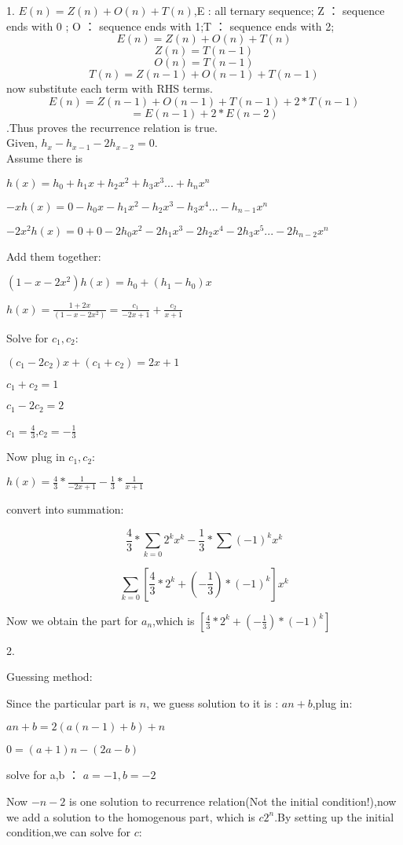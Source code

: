 \documentclass{article}
\begin{document}
1.
$E(n) = Z(n)+ O(n) + T(n)$,E : all ternary sequence; Z ： sequence ends with 0 ; O ： sequence ends with 1;T ： sequence ends with 2;
$$E(n) = Z(n)+ O(n) + T(n)$$
$$Z(n) = T(n-1)$$
$$O(n) = T(n-1)$$
$$T(n) = Z(n-1)+ O(n-1) + T(n-1) $$
now substitute each term with RHS terms.
$$E(n) = Z(n-1)+ O(n-1) + T(n-1)+ 2*T(n-1)$$
$$= E(n-1)+ 2*E(n-2)$$.Thus proves the recurrence relation is true.\\

Given, $h_x-h_{x-1}-2h_{x-2}=0$.
\\Assume there is 

$h(x) = h_0+h_1x+h_2x^2+h_3x^3...+h_nx^n$

$-xh(x) = 0-h_0x-h_1x^2-h_2x^3-h_3x^4...-h_{n-1}x^n$

$-2x^2h(x) = 0+0-2h_0x^2-2h_1x^3-2h_2x^4-2h_3x^5...-2h_{n-2}x^n$

Add them together:

$(1-x-2x^2)h(x)=h_0+(h_1-h_0)x$

$h(x)=\frac{1+2x}{(1-x-2x^2)}=\frac{c_1}{-2x+1}+\frac{c_2}{x+1}$

Solve for $c_1,c_2$:

$(c_1-2c_2)x+(c_1+c_2)=2x+1$

$c_1+c_2=1$

$c_1-2c_2=2$

$c_1=\frac{4}{3}$,$c_2=-\frac{1}{3}$

Now plug in $c_1,c_2$:

$h(x)=\frac{4}{3}*\frac{1}{-2x+1}-\frac{1}{3}*\frac{1}{x+1}$

convert into summation:

$$\frac{4}{3}*\sum_{k=0}2^kx^k-\frac{1}{3}*\sum(-1)^kx^k$$

$$\sum_{k=0}[\frac{4}{3}*2^k+(-\frac{1}{3})*(-1)^k]x^k$$

Now we obtain the part for $a_n$,which is $[\frac{4}{3}*2^k+(-\frac{1}{3})*(-1)^k]$

2.

Guessing method:

Since the particular part is $n$, we guess solution to it is :
$an+b$,plug in:

$an+b=2(a(n-1)+b)+n$

$0=(a+1)n-(2a-b)$

solve for a,b ： $a = -1,b=-2$

Now $-n-2$ is one solution to recurrence relation(Not the initial condition!),now we add a solution to the homogenous part, which is $c2^n$.By setting up the initial condition,we can solve for $c$:
\end{document}
